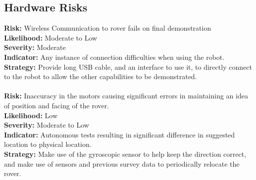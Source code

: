 \documentclass[12pt,a4paper]{article}
\begin{document}
    \subsection{Hardware Risks}
    \textbf{Risk:} Wireless Communication to rover fails on final demonstration\\
    \textbf{Likelihood:} Moderate to Low\\
    \textbf{Severity:} Moderate\\
    \textbf{Indicator:} Any instance of connection difficulties when using the robot.\\
    \textbf{Strategy:} Provide long USB cable, and an interface to use it, to directly connect to the robot to allow the other capabilities to be demonstrated.\\ \\    
\textbf{Risk:} Inaccuracy in the motors causing significant errors in maintaining an idea of position and facing of the rover.\\
    \textbf{Likelihood:} Low\\
    \textbf{Severity:} Moderate to Low\\
    \textbf{Indicator:} Autonomous tests resulting in significant difference in suggested location to physical location.\\
    \textbf{Strategy:} Make use of the gyroscopic sensor to help keep the direction correct, and make use of sensors and previous survey data to periodically relocate the rover.\\ \\    
\end{document}
